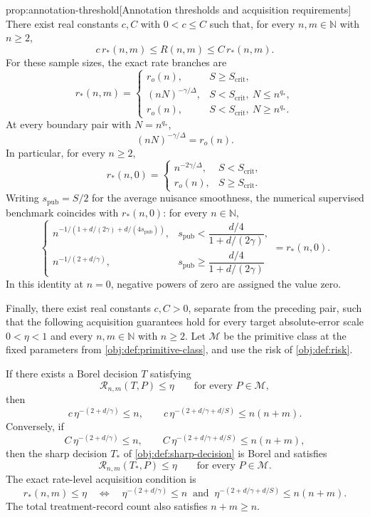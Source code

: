 \documentclass[11pt]{article}
\begin{document}
\begin{propositionv}{prop:annotation-threshold}[Annotation thresholds and acquisition requirements]
There exist real constants \(c,C\) with \(0<c\le C\) such that, for every \(n,m\in\mathbb N\) with \(n\ge2\),
\[
c\,r_*(n,m)\le R(n,m)\le C\,r_*(n,m).
\]
For these sample sizes, the exact rate branches are
\[
r_*(n,m)=
\begin{cases}
r_o(n),&S\ge S_{\mathrm{crit}},\\
(nN)^{-\gamma/\Delta},
&S<S_{\mathrm{crit}},\ N\le n^{q_*},\\
r_o(n),
&S<S_{\mathrm{crit}},\ N\ge n^{q_*}.
\end{cases}
\]
At every boundary pair with \(N=n^{q_*}\),
\[
(nN)^{-\gamma/\Delta}=r_o(n).
\]
In particular, for every \(n\ge2\),
\[
r_*(n,0)=
\begin{cases}
n^{-2\gamma/\Delta},&S<S_{\mathrm{crit}},\\
r_o(n),&S\ge S_{\mathrm{crit}}.
\end{cases}
\]
Writing \(s_{\mathrm{pub}}=S/2\) for the average nuisance smoothness, the numerical supervised benchmark coincides with \(r_*(n,0)\): for every \(n\in\mathbb N\),
\[
\begin{cases}
n^{-1/(1+d/(2\gamma)+d/(4s_{\mathrm{pub}}))},
&s_{\mathrm{pub}}<\dfrac{d/4}{1+d/(2\gamma)},\\
n^{-1/(2+d/\gamma)},
&s_{\mathrm{pub}}\ge\dfrac{d/4}{1+d/(2\gamma)}
\end{cases}
=r_*(n,0).
\]
In this identity at \(n=0\), negative powers of zero are assigned the value zero.

Finally, there exist real constants \(c,C>0\), separate from the preceding pair, such that the following acquisition guarantees hold for every target absolute-error scale \(0<\eta<1\) and every \(n,m\in\mathbb N\) with \(n\ge2\). Let \(\mathcal M\) be the primitive class at the fixed parameters from \cref{obj:def:primitive-class}, and use the risk of \cref{obj:def:risk}.

If there exists a Borel decision \(T\) satisfying
\[
\mathcal R_{n,m}(T,P)\le\eta
\qquad\text{for every }P\in\mathcal M,
\]
then
\[
c\,\eta^{-(2+d/\gamma)}\le n,
\qquad
c\,\eta^{-(2+d/\gamma+d/S)}\le n(n+m).
\]
Conversely, if
\[
C\,\eta^{-(2+d/\gamma)}\le n,
\qquad
C\,\eta^{-(2+d/\gamma+d/S)}\le n(n+m),
\]
then the sharp decision \(T_*\) of \cref{obj:def:sharp-decision} is Borel and satisfies
\[
\mathcal R_{n,m}(T_*,P)\le\eta
\qquad\text{for every }P\in\mathcal M.
\]
The exact rate-level acquisition condition is
\[
r_*(n,m)\le\eta
\quad\Longleftrightarrow\quad
\eta^{-(2+d/\gamma)}\le n
\ \text{ and }\
\eta^{-(2+d/\gamma+d/S)}\le n(n+m).
\]
The total treatment-record count also satisfies \(n+m\ge n\).
\end{propositionv}
\end{document}
